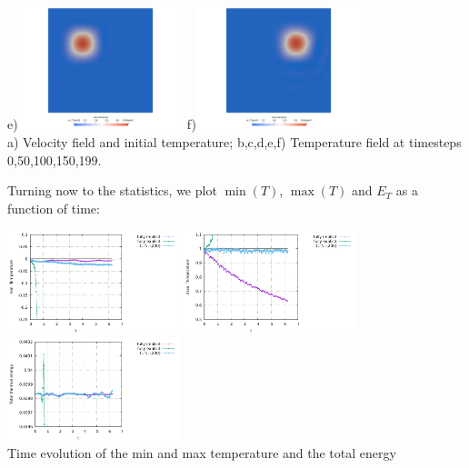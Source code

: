 \begin{center}
e)\includegraphics[width=4.8cm]{python_codes/fieldstone_43/images/crni/crnitemp0050}
f)\includegraphics[width=4.8cm]{python_codes/fieldstone_43/images/crni/crnitemp0199}\\
{\small a) Velocity field and initial temperature; b,c,d,e,f) Temperature field at timesteps 0,50,100,150,199.} 
\end{center}
Turning now to the statistics, we plot $\min(T)$, $\max(T)$ and $E_T$ as a function of time:
\begin{center}
\includegraphics[width=5cm]{python_codes/fieldstone_43/images/Tmin.pdf}
\includegraphics[width=5cm]{python_codes/fieldstone_43/images/Tmax.pdf}
\includegraphics[width=5cm]{python_codes/fieldstone_43/images/ET.pdf}\\
{\small Time evolution of the min and max temperature and the total energy}
\end{center}
